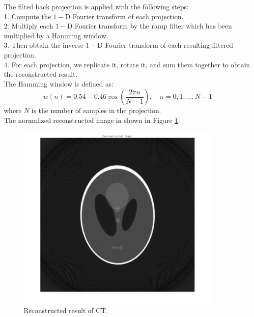 The filted back projection is applied with the following steps: \\
1. Compute the $1-$D Fourier transform of each projection. \\
2. Multiply each $1-$D Fourier transform by the ramp filter which has been multiplied by a Hamming window. \\
3. Then obtain the inverse $1-$D Fourier transform of each resulting filtered projection. \\
4. For each projection, we replicate it, rotate it, and sum them together to obtain the reconstructed result. \\
The Hamming window is defined as:
$$w(n) = 0.54 - 0.46 \cos\left(\frac{2\pi n}{N-1}\right), \quad n = 0, 1, \ldots, N-1$$
where $N$ is the number of samples in the projection. \\
The normalized reconstructed image in shown in Figure \ref{fig:p1}.

\begin{figure}[htbp]
    \centering
	\includegraphics[width=0.9\textwidth]{../images/p1/p1.png}
    \caption{Reconstructed result of CT.}
    \label{fig:p1}
\end{figure}

\newpage